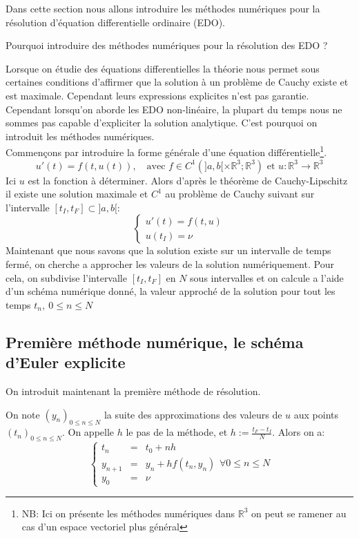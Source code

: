 \documentclass{article}
\newcommand{\R}{\mathbb{R}}
\newtheorem[M , nocut]{prop}{Proposition}[section]
\newtheorem[S , nocut]{definition}{Définition}
\newtheorem[S , nocut]{lemme}{Lemme}
\newtheorem[L , nocut]{thm}{Théoreme}
\newtheorem[L , nocut]{cor}{Corollaire}
\begin{document}
Dans cette section nous allons introduire les méthodes numériques pour la résolution d'équation differentielle ordinaire (EDO). 
\begin{example}[Problématique]
    Pourquoi introduire des méthodes numériques pour la résolution des EDO ? 
\end{example}
Lorsque on étudie des équations differentielles la théorie nous permet sous certaines conditions d'affirmer que la solution à un problème de Cauchy existe et est maximale. Cependant leurs expressions explicites n'est pas garantie. Cependant lorsqu'on aborde les EDO non-linéaire, la plupart du temps nous ne sommes pas capable d'expliciter la solution analytique. C'est pourquoi on introduit les méthodes numériques.\\
Commençons par introduire la forme générale d'une équation différentielle\footnote{NB: Ici on présente les méthodes numériques dans $\R^3$ on peut se ramener au cas d'un espace vectoriel plus général}.
\[
    u'(t) = f(t,u(t)),\quad \text{avec } f\in C^1(]a,b[ \times \R^3 ;\R^3)\text{ et }u : \R^3 \to \R^3
\]
Ici $u$ est la fonction à déterminer. Alors d'après le théorème de Cauchy-Lipschitz il existe une solution maximale et $C^1$ au problème de Cauchy suivant sur l'intervalle $[t_I,t_F] \subset ]a,b[ $:
\[
    \left\{\begin{array}{l}
        u'(t)=f(t,u)\\
        u(t_I) = \nu
    \end{array}\right.
\]
Maintenant que nous savons que la solution existe sur un intervalle de temps fermé, on cherche a approcher les valeurs de la solution numériquement. Pour cela, on subdivise l'intervalle $[t_I,t_F]$ en $N$ sous intervalles et on calcule a l'aide d'un schéma numérique donné, la valeur approché de la solution pour tout les temps $t_n,\ 0\le n \le N$

\subsection*{Première méthode numérique, le schéma d'Euler explicite}
On introduit maintenant la première méthode de résolution.
\begin{definition}
    On note $(y_n)_{0 \le n \le N}$ la suite des approximations des valeurs de $u$ aux points $(t_n)_{0 \le n \le N}$. On appelle $h$ le pas de la méthode, et $h:= \frac{t_F-t_I}{N}$. Alors on a:
    \[
        \left\{\begin{array}{rcl}
        t_n &=& t_0 + n h \\
        y_{n+1} &=& y_n + h f(t_n,y_n)\\
        y_0 &=& \nu
        \end{array}\right. \forall 0 \le n \le N
    \]
\end{definition}
\end{document}

